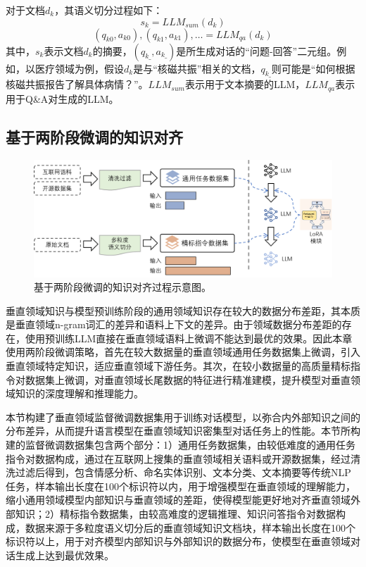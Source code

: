对于文档$d_k$，其语义切分过程如下：
\begin{equation}
	s_k = LLM_{sum}(d_k)
\end{equation}
\begin{equation}
	(q_{k0}, a_{k0}), (q_{k1}, a_{k1}), \dots = LLM_{qa}(d_k)
\end{equation}
其中，$s_k$表示文档$d_k$的摘要，$(q_{k\_}, a_{k\_})$是所生成对话的“问题-回答”二元组。例如，以医疗领域为例，假设$d_k$是与“核磁共振”相关的文档，$q_{k\_}$则可能是“如何根据核磁共振报告了解具体病情？”。$LLM_{sum}$表示用于文本摘要的LLM，$LLM_{qa}$表示用于Q\&A对生成的LLM。

\subsection{基于两阶段微调的知识对齐}

\begin{figure}[htbp]
	\centering
	\includegraphics[scale=0.6]{Fig/finetune_align_process.png}
	\caption{\label{finetune_align_process}基于两阶段微调的知识对齐过程示意图。}
\end{figure}

垂直领域知识与模型预训练阶段的通用领域知识存在较大的数据分布差距，其本质是垂直领域n-gram词汇的差异和语料上下文的差异。由于领域数据分布差距的存在，使用预训练LLM直接在垂直领域语料上微调不能达到最优的效果。因此本章使用两阶段微调策略，首先在较大数据量的垂直领域通用任务数据集上微调，引入垂直领域特定知识，适应垂直领域下游任务。其次，在较小数据量的高质量精标指令对数据集上微调，对垂直领域长尾数据的特征进行精准建模，提升模型对垂直领域知识的深度理解和推理能力。

本节构建了垂直领域监督微调数据集用于训练对话模型，以弥合内外部知识之间的分布差异，从而提升语言模型在垂直领域知识密集型对话任务上的性能。本节所构建的监督微调数据集包含两个部分：1）通用任务数据集，由较低难度的通用任务指令对数据构成，通过在互联网上搜集的垂直领域相关语料或开源数据集，经过清洗过滤后得到，包含情感分析、命名实体识别、文本分类、文本摘要等传统NLP任务，样本输出长度在100个标识符以内，用于增强模型在垂直领域的理解能力，缩小通用领域模型内部知识与垂直领域的差距，使得模型能更好地对齐垂直领域外部知识；2）精标指令数据集，由较高难度的逻辑推理、知识问答指令对数据构成，数据来源于多粒度语义切分后的垂直领域知识文档块，样本输出长度在100个标识符以上，用于对齐模型内部知识与外部知识的数据分布，使模型在垂直领域对话生成上达到最优效果。

